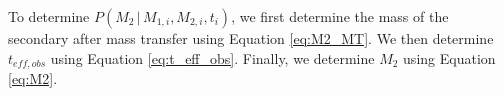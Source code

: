 \documentclass[12pt, preprint]{aastex}
\newcommand{\given}{\,|\,}
\newcommand{\dd}{\mathrm{d}}
\begin{document}
To determine $P(M_2 \given M_{1,i}, M_{2,i}, t_i )$, we first determine the mass of the secondary after mass transfer using Equation \ref{eq:M2_MT}. We then determine $t_{eff,obs}$ using Equation \ref{eq:t_eff_obs}. Finally, we determine $M_2$ using Equation \ref{eq:M2}.

\end{document}
